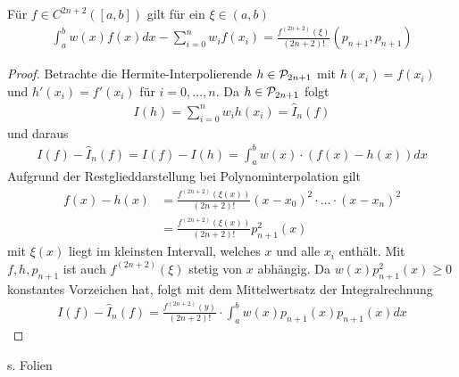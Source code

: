 \documentclass[ngerman,fontsize=11pt, paper=a4, parskip=half, titlepage=true, toc=bib]{scrbook}
\begin{document}
\begin{Satze}[Approximationsfehler]\label{7.4.9}
  Für $f\in C^{2n+2}([a,b])$ gilt für ein $\xi\in(a,b)$
  \begin{gather}
    \int_a^bw(x)f(x)dx-\sum_{i=0}^nw_if(x_i) =
    \frac{f^{(2n+2)}(\xi)}{(2n+2)!}(p_{n+1},p_{n+1})
    \label{VII.4.8}
  \end{gather}
  
  \begin{proof}
    Betrachte die Hermite-Interpolierende $h\in\mathcal{P}_{2n+1}$
    mit $h(x_i)=f(x_i)$ und $h'(x_i)=f'(x_i)$ für $i=0,\ldots,n$.
    Da $h\in\mathcal{P}_{2n+1}$ folgt
    \begin{gather*}
      I(h) = \sum_{i=0}^nw_ih(x_i)=\hat{I}_n(f)
    \end{gather*}
    und daraus 
    \begin{gather*}
      I(f)-\hat{I}_n(f) = I(f)-I(h) 
      =\int_a^bw(x)\cdot\left( f(x)-h(x)\right) dx
    \end{gather*}
Aufgrund der Restglieddarstellung bei Polynominterpolation gilt
\begin{align*}
  f(x)-h(x) &= \frac{f^{(2n+2)}\left(\xi(x)\right)}{(2n+2)!}(x-x_0)^2
              \cdot \ldots\cdot (x-x_n)^2 \\
            &=\frac{f^{(2n+2)}\left(\xi(x)\right)}{(2n+2)!}p_{n+1}^2(x)
\end{align*}
mit $\xi(x)$ liegt im kleinsten Intervall, welches $x$ und alle $x_i$
enthält.
Mit $f,h,p_{n+1}$ ist auch $f^{(2n+2)}(\xi)$ stetig von $x$ abhängig.
Da $w(x)p_{n+1}^2(x)\geq 0$ konstantes Vorzeichen hat,
folgt mit dem Mittelwertsatz der Integralrechnung
\begin{gather*}
  I(f) -\hat{I}_n(f) = \frac{f^{(2n+2)}(y)}{(2n+2)!}
   \cdot \int_a^bw(x)p_{n+1}(x)p_{n+1}(x)dx
\end{gather*}
  \end{proof}
\end{Satze}

s. Folien


\nocite{*} %
\backmatter		%


\printindex		%

\printbibliography	%
\end{document}
